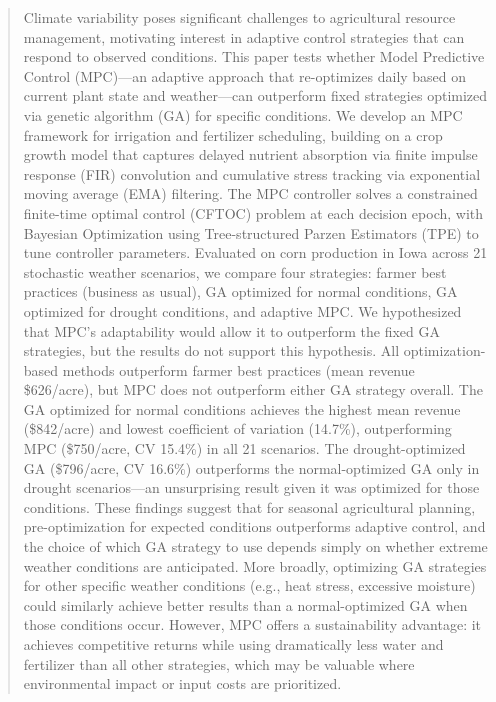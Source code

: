 \documentclass[preprint,12pt]{elsarticle}
\begin{document}
\begin{frontmatter}
\begin{abstract}
Climate variability poses significant challenges to agricultural resource management, motivating interest in adaptive control strategies that can respond to observed conditions. This paper tests whether Model Predictive Control (MPC)---an adaptive approach that re-optimizes daily based on current plant state and weather---can outperform fixed strategies optimized via genetic algorithm (GA) for specific conditions. We develop an MPC framework for irrigation and fertilizer scheduling, building on a crop growth model that captures delayed nutrient absorption via finite impulse response (FIR) convolution and cumulative stress tracking via exponential moving average (EMA) filtering. The MPC controller solves a constrained finite-time optimal control (CFTOC) problem at each decision epoch, with Bayesian Optimization using Tree-structured Parzen Estimators (TPE) to tune controller parameters. Evaluated on corn production in Iowa across 21 stochastic weather scenarios, we compare four strategies: farmer best practices (business as usual), GA optimized for normal conditions, GA optimized for drought conditions, and adaptive MPC. We hypothesized that MPC's adaptability would allow it to outperform the fixed GA strategies, but the results do not support this hypothesis. All optimization-based methods outperform farmer best practices (mean revenue \$626/acre), but MPC does not outperform either GA strategy overall. The GA optimized for normal conditions achieves the highest mean revenue (\$842/acre) and lowest coefficient of variation (14.7\%), outperforming MPC (\$750/acre, CV 15.4\%) in all 21 scenarios. The drought-optimized GA (\$796/acre, CV 16.6\%) outperforms the normal-optimized GA only in drought scenarios---an unsurprising result given it was optimized for those conditions. These findings suggest that for seasonal agricultural planning, pre-optimization for expected conditions outperforms adaptive control, and the choice of which GA strategy to use depends simply on whether extreme weather conditions are anticipated. More broadly, optimizing GA strategies for other specific weather conditions (e.g., heat stress, excessive moisture) could similarly achieve better results than a normal-optimized GA when those conditions occur. However, MPC offers a sustainability advantage: it achieves competitive returns while using dramatically less water and fertilizer than all other strategies, which may be valuable where environmental impact or input costs are prioritized.
\end{abstract}



\end{frontmatter}
\end{document}
